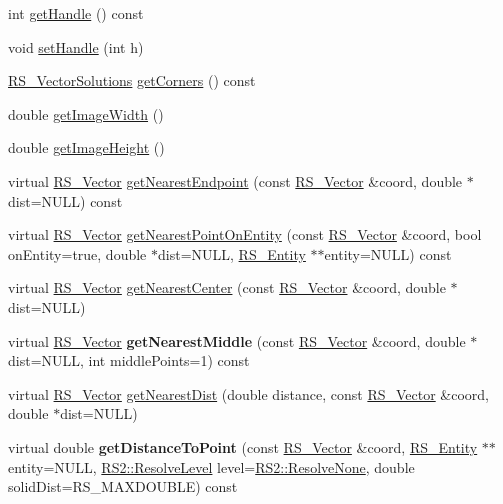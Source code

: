 \begin{DoxyCompactItemize}
\item 
int \hyperlink{classRS__Image_a65292a6bde0a87ea1e60e29c79d5c2e3}{get\-Handle} () const 
\item 
void \hyperlink{classRS__Image_ac4d2d3af7d9ef9a93bbc09b495adbda0}{set\-Handle} (int h)
\item 
\hyperlink{classRS__VectorSolutions}{R\-S\-\_\-\-Vector\-Solutions} \hyperlink{classRS__Image_a80f8d882eef9660b17890e197b18daea}{get\-Corners} () const 
\item 
double \hyperlink{classRS__Image_a3e2ed7267e91eef1d5cd8d1a303c62b8}{get\-Image\-Width} ()
\item 
double \hyperlink{classRS__Image_a5e9fc2a77acfb97e2ede087f4c1e3128}{get\-Image\-Height} ()
\item 
virtual \hyperlink{classRS__Vector}{R\-S\-\_\-\-Vector} \hyperlink{classRS__Image_aab3ed89c830ad7fdde728be151fa45d6}{get\-Nearest\-Endpoint} (const \hyperlink{classRS__Vector}{R\-S\-\_\-\-Vector} \&coord, double $\ast$dist=N\-U\-L\-L) const 
\item 
virtual \hyperlink{classRS__Vector}{R\-S\-\_\-\-Vector} \hyperlink{classRS__Image_aad68aa3b15d1f12bd23490b3a8ec4024}{get\-Nearest\-Point\-On\-Entity} (const \hyperlink{classRS__Vector}{R\-S\-\_\-\-Vector} \&coord, bool on\-Entity=true, double $\ast$dist=N\-U\-L\-L, \hyperlink{classRS__Entity}{R\-S\-\_\-\-Entity} $\ast$$\ast$entity=N\-U\-L\-L) const 
\item 
virtual \hyperlink{classRS__Vector}{R\-S\-\_\-\-Vector} \hyperlink{classRS__Image_aa6cee58a4b698fe918193abd1ca1e7d9}{get\-Nearest\-Center} (const \hyperlink{classRS__Vector}{R\-S\-\_\-\-Vector} \&coord, double $\ast$dist=N\-U\-L\-L)
\item 
\hypertarget{classRS__Image_a6b7b069605dce01b5e3469f125431296}{virtual \hyperlink{classRS__Vector}{R\-S\-\_\-\-Vector} {\bfseries get\-Nearest\-Middle} (const \hyperlink{classRS__Vector}{R\-S\-\_\-\-Vector} \&coord, double $\ast$dist=N\-U\-L\-L, int middle\-Points=1) const }\label{classRS__Image_a6b7b069605dce01b5e3469f125431296}

\item 
virtual \hyperlink{classRS__Vector}{R\-S\-\_\-\-Vector} \hyperlink{classRS__Image_a62d8418ccd66ebac96e0af56ed4f38d4}{get\-Nearest\-Dist} (double distance, const \hyperlink{classRS__Vector}{R\-S\-\_\-\-Vector} \&coord, double $\ast$dist=N\-U\-L\-L)
\item 
\hypertarget{classRS__Image_a8778e685dc1faa1d89fecda279c20285}{virtual double {\bfseries get\-Distance\-To\-Point} (const \hyperlink{classRS__Vector}{R\-S\-\_\-\-Vector} \&coord, \hyperlink{classRS__Entity}{R\-S\-\_\-\-Entity} $\ast$$\ast$entity=N\-U\-L\-L, \hyperlink{classRS2_a1b2c5e3a3e9d1b03a9564229255faa20}{R\-S2\-::\-Resolve\-Level} level=\hyperlink{classRS2_a1b2c5e3a3e9d1b03a9564229255faa20aecb7396f39bc313ad8903c8a5fac5a50}{R\-S2\-::\-Resolve\-None}, double solid\-Dist=R\-S\-\_\-\-M\-A\-X\-D\-O\-U\-B\-L\-E) const }\label{classRS__Image_a8778e685dc1faa1d89fecda279c20285}


\end{DoxyCompactItemize}

